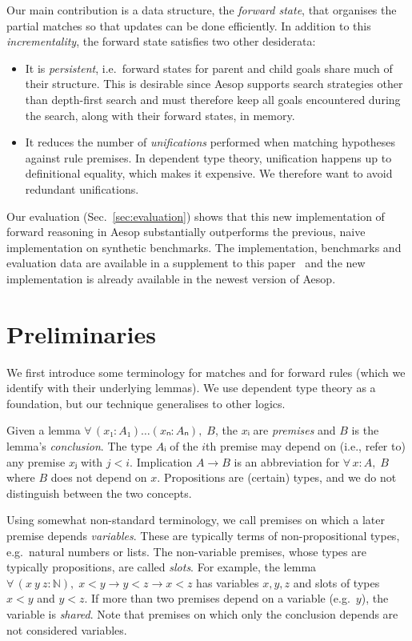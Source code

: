 \documentclass[runningheads,leqno]{llncs}
\newcommand{\All}[2]{\ensuremath{\forall\, #1,\; #2}}
\begin{document}
Our main contribution is a data structure, the \emph{forward state}, that organises the partial matches so that updates can be done efficiently.
In addition to this \emph{incrementality}, the forward state satisfies two other desiderata:
\begin{itemize}
  \item It is \emph{persistent}, i.e.\ forward states for parent and child goals share much of their structure.
        This is desirable since Aesop supports search strategies other than depth-first search and must therefore keep all goals encountered during the search, along with their forward states, in memory.
  \item It reduces the number of \emph{unifications} performed when matching hypotheses against rule premises.
        In dependent type theory, unification happens up to definitional equality, which makes it expensive.
        We therefore want to avoid redundant unifications.
\end{itemize}

Our evaluation (Sec.~\ref{sec:evaluation}) shows that this new implementation of forward reasoning in Aesop substantially outperforms the previous, naive implementation on synthetic benchmarks.
The implementation, benchmarks and evaluation data are available in a supplement to this paper~\cite{supplement} and the new implementation is already available in the newest version of Aesop.

\section{Preliminaries}

We first introduce some terminology for matches and for forward rules (which we identify with their underlying lemmas).
We use dependent type theory as a foundation, but our technique generalises to other logics.

Given a lemma $\All{(x₁ : A₁) \dots (xₙ : Aₙ)}{B}$, the $xᵢ$ are \emph{premises} and $B$ is the lemma's \emph{conclusion}.
The type $Aᵢ$ of the $i$th premise may depend on (i.e., refer to) any premise $xⱼ$ with $j < i$.
Implication $A → B$ is an abbreviation for $\All{x : A}{B}$ where $B$ does not depend on $x$.
Propositions are (certain) types, and we do not distinguish between the two concepts.

Using somewhat non-standard terminology, we call premises on which a later premise depends \emph{variables}.
These are typically terms of non-propositional types, e.g.\ natural numbers or lists.
The non-variable premises, whose types are typically propositions, are called \emph{slots}.
For example, the lemma $\All{(x~y~z : ℕ)}{x < y → y < z → x < z}$ has variables $x, y, z$ and slots of types $x < y$ and $y < z$.
If more than two premises depend on a variable (e.g.\ $y$), the variable is \emph{shared}.
Note that premises on which only the conclusion depends are not considered variables.
\end{document}

